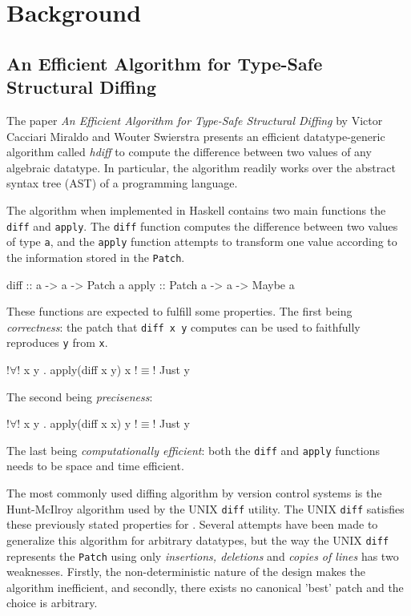 \section{Background}

\subsection{An Efficient Algorithm for Type-Safe Structural Diffing}
The paper \textit{An Efficient Algorithm for Type-Safe Structural Diffing} by Victor Cacciari Miraldo and Wouter Swierstra presents an efficient datatype-generic algorithm called \textit{hdiff} to compute the difference between two values of any algebraic datatype. In particular, the algorithm readily works over the abstract syntax tree (AST) of a programming language\cite{miraldo2019efficient}.

The algorithm when implemented in Haskell contains two main functions the \texttt{diff} and \texttt{apply}. The \texttt{diff} function computes the difference between two values of type \texttt{a}, and the \texttt{apply} function attempts to transform one value according to the information stored in the \texttt{Patch}.
\begin{haskell}
    diff  :: a -> a -> Patch a
    apply :: Patch a -> a -> Maybe a
\end{haskell}

These functions are expected to fulfill some properties. The first being \textit{correctness}: the patch that \texttt{diff x y} computes can be used to faithfully reproduces \texttt{y} from \texttt{x}.
\begin{haskell}
    !$\forall$! x y . apply(diff x y) x !$\equiv$! Just y
\end{haskell}
The second being \textit{preciseness}:
\begin{haskell}
    !$\forall$! x y . apply(diff x x) y !$\equiv$! Just y
\end{haskell}
The last being \textit{computationally efficient}: both the \texttt{diff} and \texttt{apply} functions needs to be space and time efficient.

The most commonly used diffing algorithm by version control systems is the Hunt-McIlroy algorithm used by the UNIX \texttt{diff} utility\cite{hunt1976algorithm}. The UNIX \texttt{diff} satisfies these previously stated properties for \cite{miraldo2019efficient}. Several attempts have been made to generalize this algorithm for arbitrary datatypes, but the way the UNIX \texttt{diff} represents the \texttt{Patch} using only \textit{insertions, deletions} and \textit{copies of lines} has two weaknesses. Firstly, the non-deterministic nature of the design makes the algorithm inefficient, and secondly, there exists no canonical 'best' patch and the choice is arbitrary\cite{miraldo2019efficient}.

